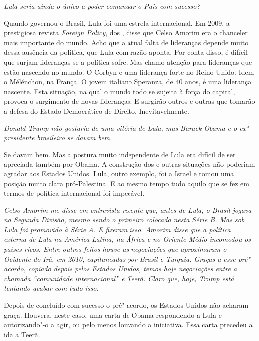 \itshape
 Lula seria ainda o único a poder comandar o País com
sucesso?

\normalfont 
Quando governou o Brasil, Lula foi uma estrela
internacional. Em 2009, a prestigiosa revista \emph{Foreign Policy}, dos
, disse que Celso Amorim era o chanceler mais importante do mundo.
Acho que a atual falta de lideranças depende muito dessa ausência da
política, que Lula com razão aponta. Por conta disso, é difícil que
surjam lideranças se a política sofre. Mas chamo atenção para lideranças
que estão nascendo no mundo. O Corbyn e uma liderança forte no Reino
Unido. Idem o Mélénchon, na França. O jovem italiano Speranza, de 40
anos, é uma liderança nascente. Esta situação, na qual o mundo todo se
sujeita à força do capital, provoca o surgimento de novas lideranças. E
surgirão outros e outras que tomarão a defesa do Estado Democrático de
Direito. Inevitavelmente.

\itshape
 Donald Trump não gostaria de uma vitória de Lula, mas
Barack Obama e o ex"-presidente brasileiro se davam bem.

\normalfont 
Se davam bem. Mas a postura muito independente de Lula
era difícil de ser apreciada também por Obama. A construção dos  e
outras situações não poderiam agradar aos Estados Unidos. Lula, outro
exemplo, foi a Israel e tomou uma posição muito clara pró-Palestina. E
ao mesmo tempo tudo aquilo que se fez em termos de política
internacional foi impecável.

\itshape
 Celso Amorim me disse em entrevista recente que, antes
de Lula, o Brasil jogava na Segunda Divisão, mesmo sendo o primeiro
colocado nesta Série B. Mas sob Lula foi promovido à Série A. E fizeram
isso. Amorim disse que a política externa de Lula na América Latina, na
África e no Oriente Médio incomodou os países ricos. Entre outros feitos
houve as negociações que aproximaram o Ocidente do Irã, em 2010,
capitaneadas por Brasil e Turquia. Graças a esse pré"-acordo, copiado
depois pelos Estados Unidos, temos hoje negociações entre a chamada
``comunidade internacional'' e Teerã. Claro que, hoje, Trump está
tentando acabar com tudo isso.

\normalfont 
Depois de concluído com sucesso o pré"-acordo, os Estados
Unidos não acharam graça. Houvera, neste caso, uma carta de Obama
respondendo a Lula e autorizando"-o a agir, ou pelo menos louvando a
iniciativa. Essa carta precedeu a ida a Teerã.

